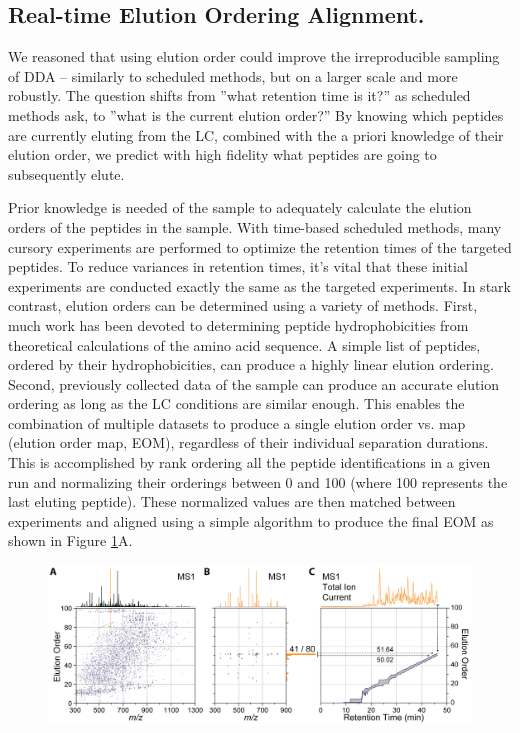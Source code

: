 \subsection*{Real-time Elution Ordering Alignment.}

We reasoned that using elution order could improve the irreproducible sampling of DDA -- similarly to scheduled methods, but on a larger scale and more robustly. The question shifts from ''what retention time is it?'' as scheduled methods ask, to ''what is the current elution order?'' By knowing which peptides are currently eluting from the LC, combined with the a priori knowledge of their elution order, we predict with high fidelity what peptides are going to subsequently elute. 

Prior knowledge is needed of the sample to adequately calculate the elution orders of the peptides in the sample. With time-based scheduled methods, many cursory experiments are performed to optimize the retention times of the targeted peptides. To reduce variances in retention times, it's vital that these initial experiments are conducted exactly the same as the targeted experiments. In stark contrast, elution orders can be determined using a variety of methods. First, much work has been devoted to determining peptide hydrophobicities from theoretical calculations of the amino acid sequence.\cite{ssrcalc,ssrcalc2,petritis,spicer} A simple list of peptides, ordered by their hydrophobicities, can produce a highly linear elution ordering. Second, previously collected data of the sample can produce an accurate elution ordering as long as the LC conditions are similar enough. This enables the combination of multiple datasets to produce a single elution order vs. \mz{} map (elution order map, EOM), regardless of their individual separation durations. This is accomplished by rank ordering all the peptide identifications in a given run and normalizing their orderings between 0 and 100 (where 100 represents the last eluting peptide). These normalized values are then matched between experiments and aligned using a simple algorithm to produce the final EOM as shown in Figure \ref{fig:eoa3}A.
\begin{figure}
	\centering
	\includegraphics[width=\columnwidth]{eoa/EOA 3.png}
	\label{fig:eoa3}
\end{figure}
